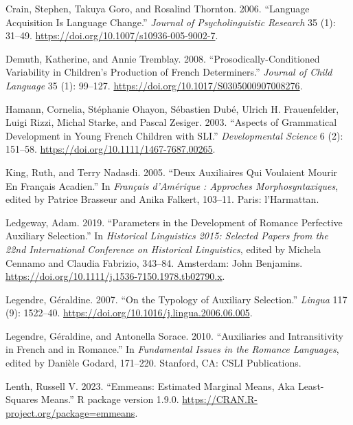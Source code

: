 \documentclass[
  12pt,
]{article}
\newlength{\cslhangindent}
\newlength{\cslentryspacingunit} %
\newenvironment{CSLReferences}[2] %
 {%
  \setlength{\parindent}{0pt}
  \ifodd #1
  \let\oldpar\par
  \def\par{\hangindent=\cslhangindent\oldpar}
  \fi
  \setlength{\parskip}{#2\cslentryspacingunit}
 }%
 {}
\begin{document}
\begin{enumerate}[resume*]
\begin{enumerate}[resume*]
\begin{enumerate}[resume*]
\begin{enumerate}[resume*]
\begin{enumerate}[resume*]
\begin{CSLReferences}{1}{0}
\leavevmode{}%
Crain, Stephen, Takuya Goro, and Rosalind Thornton. 2006. {``Language {Acquisition} Is {Language} {Change}.''} \emph{Journal of Psycholinguistic Research} 35 (1): 31--49. \url{https://doi.org/10.1007/s10936-005-9002-7}.

\leavevmode{}%
Demuth, Katherine, and Annie Tremblay. 2008. {``Prosodically-Conditioned Variability in Children's Production of {French} Determiners.''} \emph{Journal of Child Language} 35 (1): 99--127. \url{https://doi.org/10.1017/S0305000907008276}.

\leavevmode{}%
Hamann, Cornelia, Stéphanie Ohayon, Sébastien Dubé, Ulrich H. Frauenfelder, Luigi Rizzi, Michal Starke, and Pascal Zesiger. 2003. {``Aspects of Grammatical Development in Young {French} Children with {SLI}.''} \emph{Developmental Science} 6 (2): 151--58. \url{https://doi.org/10.1111/1467-7687.00265}.

\leavevmode{}%
King, Ruth, and Terry Nadasdi. 2005. {``Deux Auxiliaires Qui Voulaient Mourir En Français Acadien.''} In \emph{Français d'{Amérique} : Approches Morphosyntaxiques}, edited by Patrice Brasseur and Anika Falkert, 103--11. Paris: l'Harmattan.

\leavevmode{}%
Ledgeway, Adam. 2019. {``Parameters in the Development of {Romance} Perfective Auxiliary Selection.''} In \emph{Historical {Linguistics} 2015: {Selected} Papers from the 22nd {International} {Conference} on {Historical} {Linguistics}}, edited by Michela Cennamo and Claudia Fabrizio, 343--84. Amsterdam: John Benjamins. \url{https://doi.org/10.1111/j.1536-7150.1978.tb02790.x}.

\leavevmode{}%
Legendre, Géraldine. 2007. {``On the Typology of Auxiliary Selection.''} \emph{Lingua} 117 (9): 1522--40. \url{https://doi.org/10.1016/j.lingua.2006.06.005}.

\leavevmode{}%
Legendre, Géraldine, and Antonella Sorace. 2010. {``Auxiliaries and {Intransitivity} in {French} and in {Romance}.''} In \emph{Fundamental {Issues} in the {Romance} {Languages}}, edited by Danièle Godard, 171--220. Stanford, CA: CSLI Publications.

\leavevmode{}%
Lenth, Russell V. 2023. {``Emmeans: {Estimated} {Marginal} {Means}, Aka {Least}-{Squares} {Means}.''} R package version 1.9.0. \url{https://CRAN.R-project.org/package=emmeans}.


\end{CSLReferences}
\end{enumerate}
\end{enumerate}
\end{enumerate}
\end{enumerate}
\end{enumerate}
\end{document}
